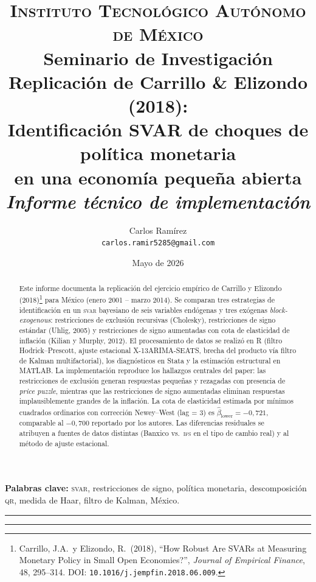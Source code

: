\documentclass[11pt,letterpaper]{article}
\title{
    \vspace{-1.5cm}
    \large\textsc{Instituto Tecnológico Autónomo de México}\\[0.2cm]
    \large Seminario de Investigación\\[0.6cm]
    \Huge\bfseries Replicación de Carrillo \& Elizondo (2018):\\
    \Large Identificación SVAR de choques de política monetaria\\
    en una economía pequeña abierta\\[0.4cm]
    \large \textit{Informe técnico de implementación}
}
\author{Carlos Ramírez \\ \small\texttt{carlos.ramir5285@gmail.com}}
\date{Mayo de 2026}
\begin{document}

\maketitle

\begin{abstract}
\noindent
Este informe documenta la replicación del ejercicio empírico de Carrillo y Elizondo (2018)\footnote{Carrillo, J.A.\ y Elizondo, R.\ (2018), ``How Robust Are SVARs at Measuring Monetary Policy in Small Open Economies?'', \textit{Journal of Empirical Finance}, 48, 295--314. DOI: \texttt{10.1016/j.jempfin.2018.06.009}.} para México (enero 2001 -- marzo 2014). Se comparan tres estrategias de identificación en un \textsc{svar} bayesiano de seis variables endógenas y tres exógenas \textit{block-exogenous}: restricciones de exclusión recursivas (Cholesky), restricciones de signo estándar (Uhlig, 2005) y restricciones de signo aumentadas con cota de elasticidad de inflación (Kilian y Murphy, 2012). El procesamiento de datos se realizó en \textsf{R} (filtro Hodrick--Prescott, ajuste estacional X-13ARIMA-SEATS, brecha del producto vía filtro de Kalman multifactorial), los diagnósticos en \textsf{Stata} y la estimación estructural en \textsf{MATLAB}. La implementación reproduce los hallazgos centrales del paper: las restricciones de exclusión generan respuestas pequeñas y rezagadas con presencia de \textit{price puzzle}, mientras que las restricciones de signo aumentadas eliminan respuestas implausiblemente grandes de la inflación. La cota de elasticidad estimada por mínimos cuadrados ordinarios con corrección Newey--West (lag = 3) es $\hat\beta_{\text{lower}} = -0{,}721$, comparable al $-0{,}700$ reportado por los autores. Las diferencias residuales se atribuyen a fuentes de datos distintas (Banxico vs.\ \textsc{ifs} en el tipo de cambio real) y al método de ajuste estacional.
\end{abstract}

\vspace{0.3cm}
\noindent\textbf{Palabras clave:} \textsc{svar}, restricciones de signo, política monetaria, descomposición \textsc{qr}, medida de Haar, filtro de Kalman, México.

\vspace{0.6cm}
\hrule
\tableofcontents
\vspace{0.3cm}
\hrule
\vspace{0.6cm}

\end{document}
